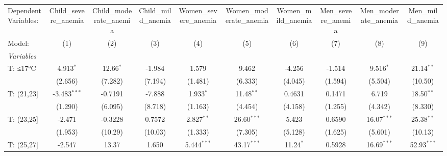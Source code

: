 \begingroup
\centering
\begin{tabular}{lccccccccc}
   \tabularnewline \midrule \midrule
   Dependent Variables:           & Child\_severe\_anemia   & Child\_moderate\_anemia   & Child\_mild\_anemia   & Women\_severe\_anemia   & Women\_moderate\_anemia   & Women\_mild\_anemia   & Men\_severe\_anemia   & Men\_moderate\_anemia   & Men\_mild\_anemia\\    
   Model:                         & (1)                     & (2)                       & (3)                   & (4)                     & (5)                       & (6)                   & (7)                   & (8)                     & (9)\\  
   \midrule
   \emph{Variables}\\
   T: ≤17°C                       & 4.913$^{*}$             & 12.66$^{*}$               & -1.984                & 1.579                   & 9.462                     & -4.256                & -1.514                & 9.516$^{*}$             & 21.14$^{**}$\\   
                                  & (2.656)                 & (7.282)                   & (7.194)               & (1.481)                 & (6.333)                   & (4.045)               & (1.594)               & (5.504)                 & (10.50)\\   
   T: (21,23]                     & -3.483$^{***}$          & -0.7191                   & -7.888                & 1.933$^{*}$             & 11.48$^{**}$              & 0.4631                & 0.1471                & 6.719                   & 18.50$^{**}$\\   
                                  & (1.290)                 & (6.095)                   & (8.718)               & (1.163)                 & (4.454)                   & (4.158)               & (1.255)               & (4.342)                 & (8.330)\\   
   T: (23,25]                     & -2.471                  & -0.3228                   & 0.7572                & 2.827$^{**}$            & 26.60$^{***}$             & 5.423                 & 0.6590                & 16.07$^{***}$           & 25.38$^{**}$\\   
                                  & (1.953)                 & (10.29)                   & (10.03)               & (1.333)                 & (7.305)                   & (5.128)               & (1.625)               & (5.601)                 & (10.13)\\   
   T: (25,27]                     & -2.547                  & 13.37                     & 1.650                 & 5.444$^{***}$           & 43.17$^{***}$             & 11.24$^{*}$           & 0.5928                & 16.69$^{***}$           & 52.93$^{***}$\\   

\end{tabular}
